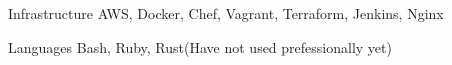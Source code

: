

\begin{cvskills}

  \cvskill
    {Infrastructure} %
    {AWS, Docker, Chef, Vagrant, Terraform, Jenkins, Nginx} %

  \cvskill
    {Languages} %
    {Bash, Ruby, Rust(Have not used prefessionally yet)} %

\end{cvskills}
